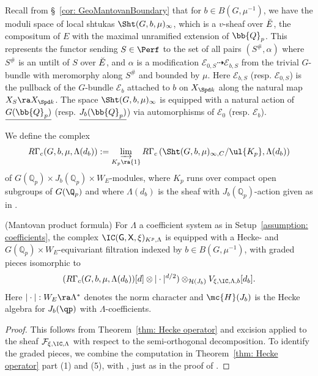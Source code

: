 \documentclass[letterpaper,11pt]{amsart}
\begin{document}
\subsubsection{}{\label{ss: Variation'sonMantovan'sFiltration}}
 Recall from \S~\ref{cor: GeoMantovanBoundary} that for $b \in B(G,\mu^{-1})$, we have the moduli space of local shtukas $\Sht(G,b,\mu)_{\infty}$, which is a $v$-sheaf over $\Breve{E}$, the compositum of $E$ with the maximal unramified extension of $\bb{Q}_p$. This represents the functor sending $S \in \Perf$ to the set of all pairs $(S^\#,\alpha)$ where $S^\#$ is an untilt of $S$ over $\Breve{E}$, and $\alpha$ is a modification $\mathcal{E}_{0,S} \dashrightarrow \mathcal{E}_{b,S}$ from the trivial $G$-bundle with meromorphy along $S^\#$ and bounded by $\mu$. Here $\mathcal{E}_{b,S}$ (resp. $\mathcal{E}_{0,S}$) is the pullback of the $G$-bundle $\mathcal{E}_{b}$ attached to $b$ on $X_{\Spd k}$ along the natural map $X_{S} \ra X_{\Spd k}$. The space $\Sht(G,b,\mu)_{\infty}$ is equipped with a natural action of $\underline{G(\bb{Q}_{p})}$ (resp. $\underline{J_{b}(\bb{Q}_{p})}$) via automorphisms of $\mathcal{E}_{0}$ (resp. $\mathcal{E}_{b}$).  

We define the complex
\begin{equation}{\label{eqn: CohofLocalShimuraVariety}}
R\Gamma_{c}(G,b,\mu,\Lambda(d_{b})) := \varinjlim_{K_{p} \ra \{1\}}R\Gamma_{c}\left(\Sht(G,b,\mu)_{\infty,C}/\ul{K_{p}},\Lambda(d_{b})\right) 
\end{equation}
of $G(\mathbb{Q}_{p}) \times J_{b}(\mathbb{Q}_{p}) \times W_{E}$-modules, where $K_p$ runs over compact open subgroups of $G(\Q_p)$ and where $\Lambda(d_{b})$ is the sheaf with $J_{b}(\mathbb{Q}_{p})$-action given as in \cite[Lemma~7.4]{KoTorsionPaper}. 
\begin{corollary}\label{cor: product formula}
    (Mantovan product formula) For $\Lambda$ a coefficient system as in Setup~\ref{assumption: coefficients}, the complex $\IC(\mathsf{G},\mathsf{X}, \xi)_{K^p,\Lambda}$ is equipped with a Hecke- and $G(\mathbb{Q}_p)\times W_E$-equivariant filtration indexed by $b\in B(G,\mu^{-1})$, with graded pieces isomorphic to 
\[
(R\Gamma_{c}(G,b,\mu,\Lambda(d_{b}))[d] \otimes |\cdot|^{d/2}) \otimes_{\mathcal{H}(J_{b})} V_{\xi,\IC,\Lambda,b}[d_{b}]. 
\]
Here $|\cdot|: W_{E} \ra \Lambda^{*}$ denotes the norm character and $\mc{H}(J_b)$ is the Hecke algebra for $J_b(\qp)$ with $\Lambda$-coefficients.
\end{corollary}
\begin{proof}
This follows from Theorem~\ref{thm: Hecke operator} and excision applied to the sheaf $\mathcal{F}_{\xi,\IC,\Lambda}$ with respect to the semi-orthogonal decomposition. To identify the graded pieces, we combine the computation in Theorem~\ref{thm: Hecke operator} part (1) and (5), with \cite[Lemma~10.1]{HamGeomES}, just as in the proof of \cite[Corollary~3.22]{HamannLeeTorsion}. 
\end{proof}
\end{document}
